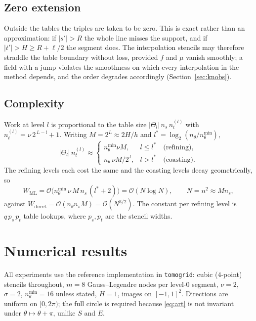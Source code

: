\documentclass[11pt]{article}
\newcommand{\bigO}{\mathcal{O}}
\begin{document}
\subsection{Zero extension}

Outside the tables the triples are taken to be zero. This is exact rather than
an approximation: if $|s'|>R$ the whole line misses the support, and if
$|t'|>H\ge R+\ell/2$ the segment does. The interpolation stencils may therefore
straddle the table boundary without loss, provided $f$ and $\mu$ vanish
smoothly; a field with a jump violates the smoothness on which every
interpolation in the method depends, and the order degrades accordingly
(Section~\ref{sec:knobs}).

\subsection{Complexity}
\label{sec:complexity}

Work at level $l$ is proportional to the table size $|\Theta_l|\,n_s\,n_t^{(l)}$
with $n_t^{(l)}=\nu\,2^{\,L-l}+1$. Writing $M=2^L\approx 2H/h$ and
$l^{*}=\log_2(n_\theta/n_\theta^{\min})$,
\begin{equation}
  |\Theta_l|\,n_t^{(l)} \approx
  \begin{cases}
    n_\theta^{\min} \nu M, & l\le l^{*}\quad\text{(refining)},\\[2pt]
    n_\theta\,\nu M/2^{\,l}, & l>l^{*}\quad\text{(coasting)} .
  \end{cases}
\end{equation}
The refining levels each cost the same and the coasting levels decay
geometrically, so
\begin{equation}
  W_{\mathrm{ML}}
  = \bigO\!\big(n_\theta^{\min}\,\nu\,M\,n_s\,(l^{*}+2)\big)
  = \bigO(N\log N),\qquad N=n^2\approx M n_s ,
  \label{eq:cost}
\end{equation}
against $W_{\mathrm{direct}}=\bigO(n_\theta n_s M)=\bigO(N^{3/2})$. The
constant per refining level is $q\,p_s\,p_t$ table lookups, where $p_s,p_t$ are
the stencil widths.

\section{Numerical results}
\label{sec:results}

All experiments use the reference implementation in
\texttt{tomogrid}: cubic ($4$-point) stencils throughout, $m=8$
Gauss--Legendre nodes per level-0 segment, $\nu=2$, $\sigma=2$,
$n_\theta^{\min}=16$ unless stated, $H=1$, images on $[-1,1]^2$. Directions are
uniform on $[0,2\pi)$; the full circle is required because \eqref{eq:art} is
not invariant under $\theta\mapsto\theta+\pi$, unlike $S$ and $E$.
\end{document}
